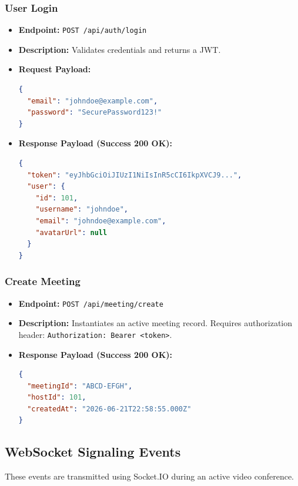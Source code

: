 \documentclass[11pt,a4paper]{article}
\begin{document}
\subsubsection{User Login}
\begin{itemize}
    \item \textbf{Endpoint:} \texttt{POST /api/auth/login}
    \item \textbf{Description:} Validates credentials and returns a JWT.
    \item \textbf{Request Payload:}
\begin{lstlisting}[language=json]
{
  "email": "johndoe@example.com",
  "password": "SecurePassword123!"
}
\end{lstlisting}
    \item \textbf{Response Payload (Success 200 OK):}
\begin{lstlisting}[language=json]
{
  "token": "eyJhbGciOiJIUzI1NiIsInR5cCI6IkpXVCJ9...",
  "user": {
    "id": 101,
    "username": "johndoe",
    "email": "johndoe@example.com",
    "avatarUrl": null
  }
}
\end{lstlisting}
\end{itemize}

\subsubsection{Create Meeting}
\begin{itemize}
    \item \textbf{Endpoint:} \texttt{POST /api/meeting/create}
    \item \textbf{Description:} Instantiates an active meeting record. Requires authorization header: \texttt{Authorization: Bearer <token>}.
    \item \textbf{Response Payload (Success 200 OK):}
\begin{lstlisting}[language=json]
{
  "meetingId": "ABCD-EFGH",
  "hostId": 101,
  "createdAt": "2026-06-21T22:58:55.000Z"
}
\end{lstlisting}
\end{itemize}

\subsection{WebSocket Signaling Events}
These events are transmitted using Socket.IO during an active video conference.
\end{document}
